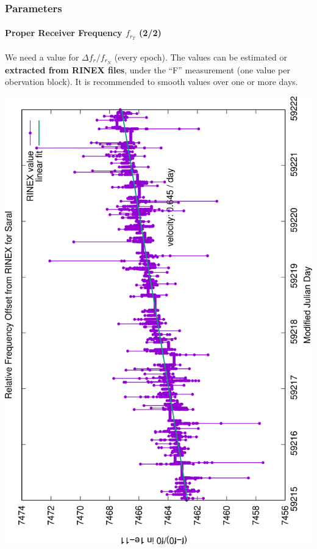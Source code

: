 \documentclass{beamer}
\begin{document}
\begin{frame}\frametitle{Parameters}\framesubtitle{Proper Receiver Frequency \(f_{r_T}\) (2/2)}
  We need a value for  \(\Delta f_r / f_{r_N}\) (every epoch). The values can be 
  estimated or \textbf{extracted from RINEX files}, under the ``F'' measurement (one value 
  per obervation block). It is recommended to smooth values over one or more days.

  \begin{center}
    \includegraphics[scale=.3, angle=-90]{Saral-RinexRfo}
  \end{center}
\end{frame}
\end{document}
